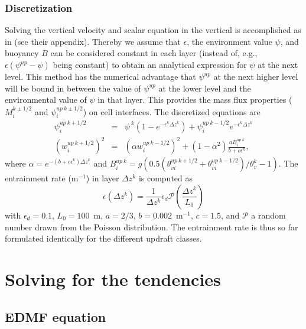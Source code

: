 \documentclass[dvipdfmx,a4paper,10pt]{article}
\begin{document}
\subsubsection{Discretization}
Solving the vertical velocity and scalar equation in the vertical is accomplished as in \cite{suselj14} (see their appendix). Thereby we assume that $\epsilon$, the environment value $\psi$, and buoyancy $B$ can be considered constant in each layer (instead of, e.g., $\epsilon(\psi^{up}-\psi)$ being constant) to obtain an analytical expression for $\psi$ at the next level. This method has the numerical advantage that $\psi^{up}$ at the next higher level will be bound in between the value of $\psi^{up}$ at the lower level and the environmental value of $\psi$ in that layer. This provides the mass flux properties ($M_i^{k\pm 1/2}$ and $\psi^{up~k\pm 1/2}_i$) on cell interfaces. The discretized equations are 
\begin{eqnarray}
 \psi_i^{up~k+1/2}&=&\psi^{~k}(1-e^{-\epsilon^{k}\Delta z^k})+\psi_i^{up~k-1/2}e^{-\epsilon^{k}\Delta z^k}\\
 (w_i^{up~k+1/2})^2&=&(\alpha w_i^{up~k-1/2})^2 + (1-\alpha^2) \frac{aB_i^{up~k}}{b+c\epsilon^k},
\end{eqnarray}
where $\alpha=e^{-(b+c\epsilon^k)\Delta z^k}$ and $B_i^{up~k}=g(0.5(\theta_{vi}^{up~k+1/2}+\theta_{vi}^{up~k-1/2})/\theta_v^{k}-1)$. The entrainment rate (m$^{-1}$) in layer $\Delta z^k$ is computed as
\begin{equation}
 \epsilon(\Delta z^k) = \frac{1}{\Delta z^k} \epsilon_d \mathcal{P}(\frac{\Delta z^k}{L_0})
\end{equation}
with $\epsilon_d=0.1$, $L_0=100$~m, $a=2/3$, $b=0.002$~m$^{-1}$, $c=1.5$, and $\mathcal{P}$ a random number drawn from the Poisson distribution. The entrainment rate is thus so far formulated identically for the different updraft classes. 

\section{Solving for the tendencies}\label{sec:solve}

\subsection{EDMF equation}
\end{document}
